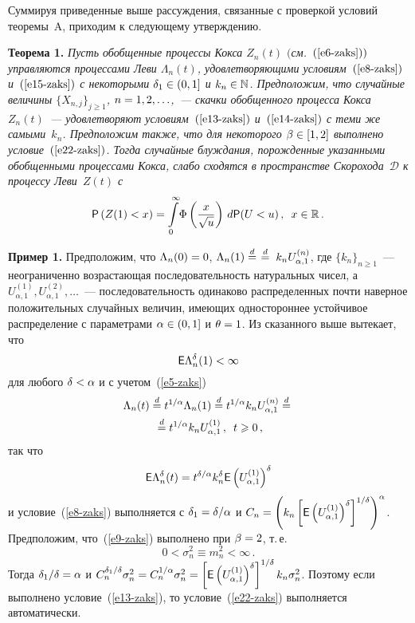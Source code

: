 \begin{multicols}{2}
Суммируя приведенные выше рассуждения, связанные с проверкой условий
теоремы~A, приходим к следующему утверждению.

\smallskip

\noindent
\textbf{Теорема 1.} \textit{Пусть обобщенные процессы Кокса $Z_n(t)$
$($см.~$(\ref{e6-zaks}))$ управляются процессами Леви $\Lambda_n(t)$,
удовле\-тво\-ря\-ющими условиям~$(\ref{e8-zaks})$ и~$(\ref{e15-zaks})$ с некоторыми
$\delta_1\hm\in(0,1]$ и $k_n\hm\in\mathbb{N}$. Предположим, что случайные
величины $\{X_{n,j}\}_{j\geqslant1}$, $n\hm=1,2,\ldots$,~--- скачки обобщенного
процесса Кокса $Z_n(t)$~--- удовлетворяют условиям~$(\ref{e13-zaks})$ и~$(\ref{e14-zaks})$ с
теми же самыми~$k_n$. Предположим также, что для некоторого
$\beta\hm\in[1,2]$ выполнено условие~$(\ref{e22-zaks})$. Тогда случайные блуждания,
порожденные указанными обобщенными процессами Кокса, слабо сходятся
в пространстве Скорохода~$\mathcal{D}$ к процессу Леви~$Z(t)$ с}
\begin{equation}
\hspace*{-1.5mm}{\sf P}\left(Z(1)<x\right)=
\int\limits_{0}^{\infty}\!\Phi\left(\displaystyle\frac{\displaystyle x\mathstrut}{\displaystyle \sqrt{u}\mathstrut}\right)\,d{\sf P}(U<u)\,,\enskip 
 x\in\mathbb{R}\,.\!\!
\label{e27-zaks}
\end{equation}

\smallskip

\noindent
\textbf{Пример 1.} Предположим, что $\Lambda_n(0)\hm=0$, $\Lambda_n(1)\stackrel{d}{=}$\linebreak 
$\stackrel{d}{=}\;k_nU^{(n)}_{\alpha,1}$, где $\{k_n\}_{n\geqslant1}$~--- неограниченно
воз\-рас\-та\-ющая последовательность натуральных чисел, а
$U^{(1)}_{\alpha,1},U^{(2)}_{\alpha,1},\ldots$~--- последовательность
одинаково распределенных почти наверное положительных случайных
величин, имеющих одностороннее устойчивое распределение с
параметрами $\alpha\hm\in(0,1]$ и $\theta\hm=1$. Из сказанного выше
вытекает, что
$$
{\sf E}\Lambda^{\delta}_n(1)<\infty
$$
для любого $\delta\hm<\alpha$ и с учетом~(\ref{e5-zaks})
\begin{multline}
\Lambda_n(t)\stackrel{d}{=} t^{1/\alpha}\Lambda_n(1)\stackrel{d}{=}
t^{1/\alpha}k_nU^{(n)}_{\alpha,1}\stackrel{d}{=}{}\\
{}\stackrel{d}{=}
t^{1/\alpha}k_nU^{(1)}_{\alpha,1}\,, \enskip t\geqslant0\,,\label{e28-zaks}
\end{multline}
так что
$$
{\sf E}\Lambda_n^{\delta}(t)=t^{\delta/\alpha}k_n^{\delta}{\sf
E}\left(U^{(1)}_{\alpha,1}\right)^{\delta}
$$
и условие~(\ref{e8-zaks}) выполняется с $\delta_1\hm=\delta/\alpha$ и
$C_n\hm=\left(k_n\left[{\sf E}\left(U_{\alpha,1}^{(1)}\right)^{\delta}\right]^{1/\delta}
\right)^{\alpha}$.
Предположим, что~(\ref{e9-zaks}) выполнено при $\beta\hm=2$, т.\,е.\
$$
0<\sigma_n^2\equiv m_n^2<\infty\,.
$$
Тогда $\delta_1/\delta\hm=\alpha$ и
$C_n^{\delta_1/\delta}\sigma_n^2\hm=C_n^{1/\alpha}\sigma_n^2\hm=\left[{\sf
E}\left(U_{\alpha,1}^{(1)}\right)^{\delta}\right]^{1/\delta}k_n\sigma_n^2$.
Поэтому если выполнено условие~(\ref{e13-zaks}), то условие~(\ref{e22-zaks}) выполняется
автоматически.


\end{multicols}
